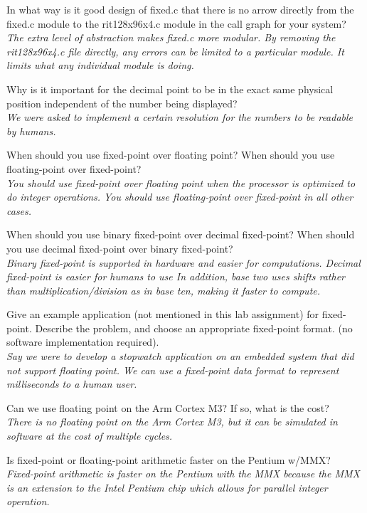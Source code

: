 \documentclass[11pt]{article}
\begin{document}
\begin{pset}
  		In what way is it good design of fixed.c that there is no arrow directly from the
        fixed.c module to the rit128x96x4.c module in the call graph for your system?\\
  
  \emph{The extra level of abstraction makes fixed.c more modular. By removing the rit128x96x4.c file directly, any errors can be limited to a particular module. It limits what any individual module is doing.}
  
    	Why is it important for the decimal point to be in the exact same physical
        position independent of the number being displayed?\\
        
     \emph{We were asked to implement a certain resolution for the numbers to be readable by humans.}
    
     When should you use fixed-point over floating point? When should you use
    	floating-point over fixed-point?\\
        
       \emph{ You should use fixed-point over floating point when the processor is optimized to do integer operations. You should use floating-point over fixed-point in all other cases.}

	 When should you use binary fixed-point over decimal fixed-point? When
    	should you use decimal fixed-point over binary fixed-point? \\
        
    \emph{Binary fixed-point is supported in hardware and easier for computations. Decimal fixed-point is easier for humans to use In addition, base two uses shifts rather than multiplication/division as in base ten, making it faster to compute.}

	 Give an example application (not mentioned in this lab assignment) for fixed-point. Describe the problem, and choose an appropriate fixed-point format. (no software implementation required).\\
    
    \emph{Say we were to develop a stopwatch application on an embedded system that did not support floating point. We can use a fixed-point data format to represent milliseconds to a human user.}
    
     Can we use floating point on the Arm Cortex M3? If so, what is the cost?\\
    
     \emph{There is no floating point on the Arm Cortex M3, but it can be simulated in software at the cost of multiple cycles.}
    
     Is fixed-point or floating-point arithmetic faster on the
    	Pentium w/MMX?\\
        
        \emph{Fixed-point arithmetic is faster on the Pentium with the MMX because the MMX is an
        extension to the Intel Pentium chip which allows for parallel integer operation.}
\end{pset}
\end{document}
